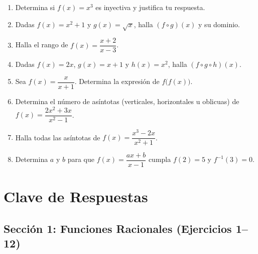 \documentclass[12pt, letterpaper]{article}
\begin{document}
\begin{enumerate}[resume=ejercicios, leftmargin=*]
  \item \facil{} Determina si $f(x) = x^3$ es inyectiva y justifica tu respuesta.

  \item \medio{} Dadas $f(x) = x^2 + 1$ y $g(x) = \sqrt{x}$, halla $(f \circ g)(x)$ y su dominio.

  \item \medio{} Halla el rango de $f(x) = \dfrac{x + 2}{x - 3}$.

  \item \medio{} Dadas $f(x) = 2x$, $g(x) = x + 1$ y $h(x) = x^2$, halla $(f \circ g \circ h)(x)$.

  \item \dificil{} Sea $f(x) = \dfrac{x}{x + 1}$. Determina la expresión de $f\big(f(x)\big)$.

  \item \dificil{} Determina el número de asíntotas (verticales, horizontales u oblicuas) de $f(x) = \dfrac{2x^2 + 3x}{x^2 - 1}$.

  \item \muyDificil{} Halla todas las asíntotas de $f(x) = \dfrac{x^3 - 2x}{x^2 + 1}$.

  \item \muyDificil{} Determina $a$ y $b$ para que $f(x) = \dfrac{ax + b}{x - 1}$ cumpla $f(2) = 5$ y $f^{-1}(3) = 0$.
\end{enumerate}
\newpage
\ifmwclaves
  \section{Clave de Respuestas}

  \subsection*{Sección 1: Funciones Racionales (Ejercicios 1--12)}
\end{document}

